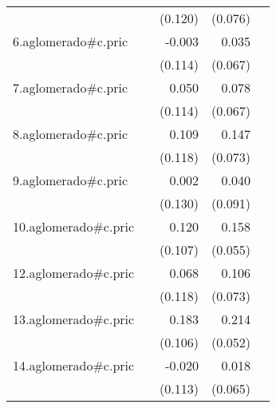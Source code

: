 {\begin{longtable}{l*{4}{D{.}{.}{-1}}}
            &                     &     (0.120)         &     (0.076)         &                     \\
\addlinespace
6.aglomerado#c.pric&                     &      -0.003         &       0.035         &                     \\
            &                     &     (0.114)         &     (0.067)         &                     \\
\addlinespace
7.aglomerado#c.pric&                     &       0.050         &       0.078         &                     \\
            &                     &     (0.114)         &     (0.067)         &                     \\
\addlinespace
8.aglomerado#c.pric&                     &       0.109         &       0.147\sym{*}  &                     \\
            &                     &     (0.118)         &     (0.073)         &                     \\
\addlinespace
9.aglomerado#c.pric&                     &       0.002         &       0.040         &                     \\
            &                     &     (0.130)         &     (0.091)         &                     \\
\addlinespace
10.aglomerado#c.pric&                     &       0.120         &       0.158\sym{**} &                     \\
            &                     &     (0.107)         &     (0.055)         &                     \\
\addlinespace
12.aglomerado#c.pric&                     &       0.068         &       0.106         &                     \\
            &                     &     (0.118)         &     (0.073)         &                     \\
\addlinespace
13.aglomerado#c.pric&                     &       0.183         &       0.214\sym{***}&                     \\
            &                     &     (0.106)         &     (0.052)         &                     \\
\addlinespace
14.aglomerado#c.pric&                     &      -0.020         &       0.018         &                     \\
            &                     &     (0.113)         &     (0.065)         &                     \\

\end{longtable}}
